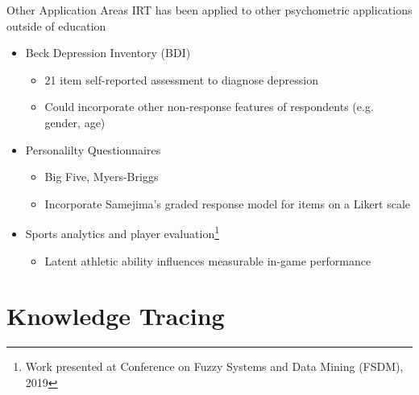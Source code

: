 \documentclass{beamer}
\theoremstyle{definition}
\begin{document}
\begin{frame}{Other Application Areas}
    IRT has been applied to other psychometric applications outside of education
      \begin{itemize}
        \item Beck Depression Inventory (BDI)
          \begin{itemize}
            \item 21 item self-reported assessment to diagnose depression
            \item Could incorporate other non-response features of respondents (e.g. gender, age)
          \end{itemize}
        \item<2-> Personalilty Questionnaires
          \begin{itemize}
            \item Big Five, Myers-Briggs
            \item Incorporate Samejima's graded response model for items on a Likert scale
          \end{itemize}
        \item<3-> Sports analytics and player evaluation\footnote{Work presented at Conference on Fuzzy Systems and Data Mining (FSDM), 2019}
          \begin{itemize}
            \item Latent athletic ability influences measurable in-game performance
          \end{itemize}
      \end{itemize}
\end{frame}


\section{Knowledge Tracing}
\end{document}
